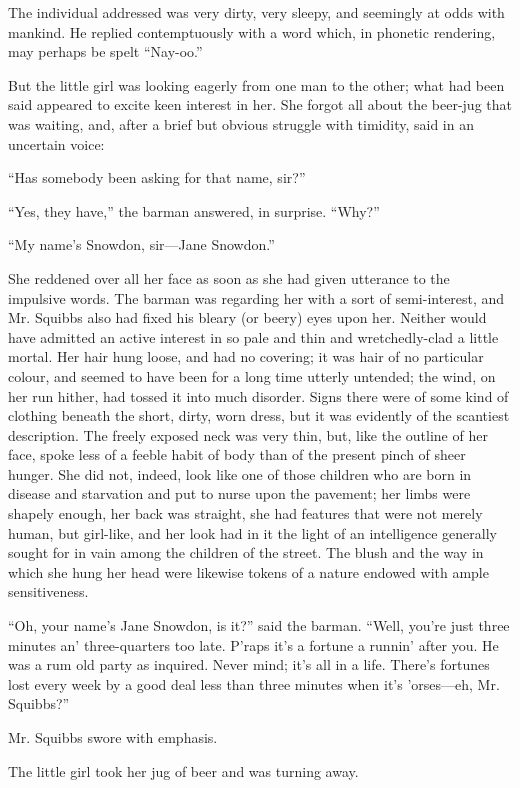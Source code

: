 The individual addressed was very dirty, very sleepy, and seemingly at
odds with mankind. He replied contemptuously with a word which, in
phonetic rendering, may perhaps be spelt ``Nay-oo.''

But the little girl was looking eagerly from one man to the other; what
had been said appeared to excite keen interest in her. She forgot all
about the beer-jug that was waiting, and, after a brief but obvious
struggle with timidity, said in an uncertain voice:

{}``Has somebody been asking for that name, sir?''

``Yes, they have,'' the barman answered, in surprise. ``Why?''

``My name's Snowdon, sir---Jane Snowdon.''

She reddened over all her face as soon as she had given utterance to the
impulsive words. The barman was regarding her with a sort of
semi-interest, and Mr. Squibbs also had fixed his bleary (or beery) eyes
upon her. Neither would have admitted an active interest in so pale and
thin and wretchedly-clad a little mortal. Her hair hung loose, and had
no covering; it was hair of no particular colour, and seemed to have
been for a long time utterly untended; the wind, on her run hither, had
tossed it into much disorder. Signs there were of some kind of clothing
beneath the short, dirty, worn dress, but it was evidently of the
scantiest description. The freely exposed neck was very thin, but, like
the outline of her face, spoke less of a feeble habit of body than of
the present pinch of sheer hunger. She did not, indeed, {}look like one
of those children who are born in disease and starvation and put to
nurse upon the pavement; her limbs were shapely enough, her back was
straight, she had features that were not merely human, but girl-like,
and her look had in it the light of an intelligence generally sought for
in vain among the children of the street. The blush and the way in which
she hung her head were likewise tokens of a nature endowed with ample
sensitiveness.

``Oh, your name's Jane Snowdon, is it?'' said the barman. ``Well, you're
just three minutes an' three-quarters too late. P'raps it's a fortune a
runnin' after you. He was a rum old party as inquired. Never mind; it's
all in a life. There's fortunes lost every week by a good deal less than
three minutes when it's 'orses---eh, Mr. Squibbs?''

Mr. Squibbs swore with emphasis.

The little girl took her jug of beer and was turning away.

